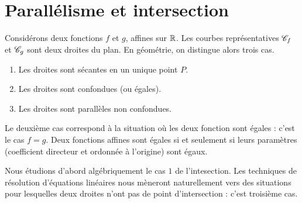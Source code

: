 




\section{Parallélisme et intersection}

Considérons deux fonctions $f$ et $g$, affines sur $\mathbb{R}$.
Les courbes représentatives $\mathcal{C}_f$ et $\mathcal{C}_g$ sont deux droites du plan.
En géométrie, on distingue alors trois cas.
	\begin{enumerate}
		\item Les droites sont sécantes en un unique point $P$.
		\item Les droites sont confondues (ou égales).
		\item Les droites sont parallèles non confondues.
	\end{enumerate}
Le deuxième cas correspond à la situation où les deux fonction sont égales : c'est le cas $f=g$.
Deux fonctions affines sont égales si et seulement si leurs paramètres (coefficient directeur et ordonnée à l'origine) sont égaux.

Nous étudions d'abord algébriquement le cas $1$ de l'intesection.
Les techniques de résolution d'équations linéaires nous mèneront naturellement vers des situations pour lesquelles deux droites n'ont pas de point d'intersection : c'est troisième cas.

